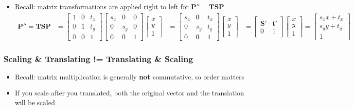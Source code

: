 \documentclass[letterpaper,12pt]{article}
\newcommand{\vect}[1]{\mathbf{#1}}
\newcommand{\matr}[1]{\mathbf{#1}}
\begin{document}
\begin{itemize}
 \item Recall: matrix transformations are applied right to left for $\vect{P}'' = \matr{T}\matr{S}\vect{P}$
       \begin{align}
        \vect{P}'' = \matr{T}\matr{S}\vect{P}
         & =
        \begin{bmatrix}
         1 & 0 & t_x \\
         0 & 1 & t_y \\
         0 & 0 & 1
        \end{bmatrix}
        \begin{bmatrix}
         s_x & 0   & 0 \\
         0   & s_y & 0 \\
         0   & 0   & 1
        \end{bmatrix}
        \begin{bmatrix}
         x \\
         y \\
         1
        \end{bmatrix}
         & = \begin{bmatrix}
         s_x & 0   & t_x \\
         0   & s_y & t_y \\
         0   & 0   & 1
        \end{bmatrix}\begin{bmatrix}
         x \\
         y \\
         1
        \end{bmatrix}
         & = \begin{bmatrix}
         \matr{S}' & \vect{t}' \\
         0         & 1
        \end{bmatrix}
        \begin{bmatrix}
         x \\
         y \\
         1
        \end{bmatrix}
        = \begin{bmatrix}
         s_x x + t_x \\
         s_y y + t_y \\
         1
        \end{bmatrix}
       \end{align}
\end{itemize}

\subsubsection{Scaling \& Translating != Translating \& Scaling}
\begin{itemize}
 \item Recall: matrix multiplication is generally \textbf{not} commutative, so order matters
 \item If you scale after you translated, both the original vector and the translation will be scaled
\end{itemize}
\end{document}
